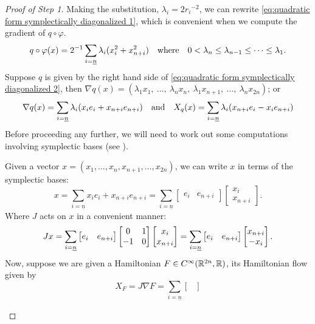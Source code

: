 \documentclass[../main-v2-manifolds.tex]{subfiles}
\begin{document}
\begin{proof}[Proof of Step 1]
    Making the substitution, $\lambda_i = 2{r_i}^{-2}$, we can rewrite \cref{eq:quadratic form symplectically diagonalized 1}, which is convenient when we compute the gradient of $q\circ\varphi$.
\begin{equation}
    q\circ\varphi(x) = 2^{-1}\sum_{i=\underline{n}}\lambda_i(x_i^2 + x_{n+i}^2)\qqtext{where} 0<\lambda_n\leq\lambda_{n-1}\leq\cdots\leq\lambda_1.
    \label{eq:quadratic form symplectically diagonalized 2}
\end{equation}
Suppose $q$ is given by the right hand side of \cref{eq:quadratic form symplectically diagonalized 2}, then $\nabla q(x) = (\lambda_1x_1,\:\ldots,\:\lambda_nx_n,\:\lambda_1x_{n+1},\:\ldots,\:\lambda_nx_{2n})$; or
\[
    \nabla q(x) = \sum_{i=\underline{n}} \lambda_i(x_ie_i + x_{n+i}e_{n+i}) \qqtext{and}X_q(x) = \sum_{i=\underline{n}}\lambda_i(x_{n+i}e_i - x_ie_{n+i})
\]
Before proceeding any further, we will need to work out some computations involving symplectic bases (see \cite{Roman2007Advanced}).
\begin{note}
    Given a vector $x = (x_1, \ldots,x_n,x_{n+1},\ldots,x_{2n})$, we can write $x$ in terms of the symplectic bases:
    \[
        x = \sum_{i=\underline{n}} x_ie_i + x_{n+i}e_{n+i} = \sum_{i=\underline{n}} \begin{bmatrix}e_i & e_{n+i}\end{bmatrix} \begin{bmatrix}x_i \\ x_{n+i}\end{bmatrix}.
    \]
    Where $J$ acts on $x$ in a convenient manner:
    \[
        Jx = \sum_{i=\underline{n}}\begin{bmatrix}
            e_i & e_{n+i}
        \end{bmatrix}\begin{bmatrix} 0 & 1 \\ -1 & 0 \end{bmatrix} \begin{bmatrix}
            x_i \\ x_{n+i}
        \end{bmatrix} = \sum_{i=\underline{n}}\begin{bmatrix}
            e_i & e_{n+i}
        \end{bmatrix}\begin{bmatrix}
            x_{n+i} \\ -x_{i}
        \end{bmatrix}.
    \]
    Now, suppose we are given a Hamiltonian $F\in C^\infty({\mathbb{R}^{2n}},\mathbb{R})$, its Hamiltonian flow given by
    \[
        X_F = J\nabla F = \sum_{i=\underline{n}}\begin{bmatrix}

\end{bmatrix}\]
\end{note}
\end{proof}
\end{document}
